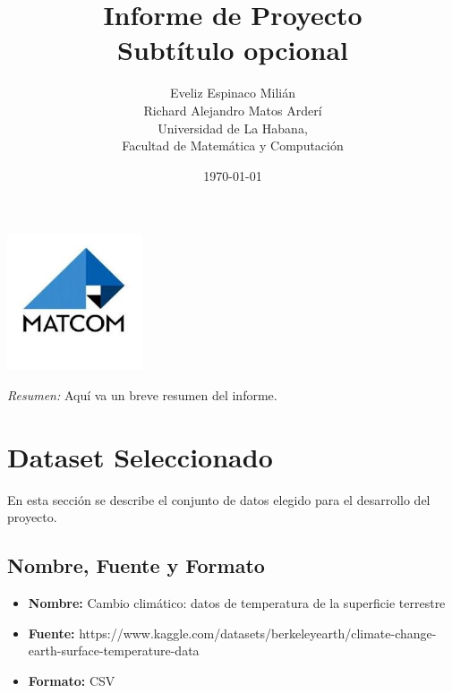 \documentclass[12pt,a4paper]{scrartcl}
\title{\Huge\bfseries Informe de Proyecto\\[1ex] \Large Subtítulo opcional}
\author{Eveliz Espinaco Milián \\ Richard Alejandro Matos Arderí \\[1ex] \small Universidad de La Habana, \\Facultad de Matemática y Computación}
\date{\today}
\begin{document}
\maketitle
\thispagestyle{empty}
\begin{center}
    \includegraphics[width=0.3\textwidth]{matcom.jpeg} %
\end{center}
\vfill
\begin{center}
    \textit{Resumen:} Aquí va un breve resumen del informe.
\end{center}
\newpage

\tableofcontents

\newpage
\section{Dataset Seleccionado}
En esta sección se describe el conjunto de datos elegido para el desarrollo del proyecto.


\subsection{Nombre, Fuente y Formato}
\begin{itemize}
    \item \textbf{Nombre:} Cambio climático: datos de temperatura de la superficie terrestre
    \item \textbf{Fuente:} https://www.kaggle.com/datasets/berkeleyearth/climate-change-earth-surface-temperature-data
    \item \textbf{Formato:} CSV
\end{itemize}
\end{document}
